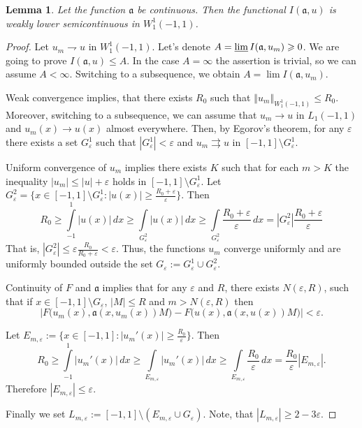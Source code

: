 \documentclass[12pt]{article}
\newcommand{\norm}[1]{\left\Vert#1\right\Vert}
\newcommand{\abs}[1]{\left\vert#1\right\vert}
\newcommand{\eps}{\varepsilon}
\renewcommand{\ge}{\geqslant}
\renewcommand{\le}{\leqslant}
\newtheorem{lm}{Lemma}
\newcommand{\W}{W_1^1}
\begin{document}
\begin{lm}
Let the function $\mathfrak a$ be continuous. Then the functional $I(\mathfrak a, u)$ is weakly lower semicontinuous in $\W(-1, 1)$.
\label{lowersemi}
\end{lm}

\begin{proof}
Let $u_m \rightharpoondown u$ in $\W(-1, 1)$.
Let's denote $A = \varliminf I( \mathfrak a, u_m ) \ge 0$.
We are going to prove $I(\mathfrak a, u) \le A$.
In the case $A = \infty$ the assertion is trivial, so we can assume $A < \infty$.
Switching to a subsequence, we obtain $A = \lim I( \mathfrak a, u_m )$.

Weak convergence implies, that there exists
$R_0$ such that $\norm{ u_m }_{\W(-1, 1)} \le R_0$.
Moreover, switching to a subsequence, we can assume that $u_m \to u$ in $L_1(-1, 1)$
and $u_m(x) \to u(x)$ almost everywhere.
Then, by Egorov's theorem, for any $\eps$ there exists a set
$G_\eps^1$ such that $\abs{ G_\eps^1 } < \eps$ and $u_m \rightrightarrows u$ in $[-1, 1] \setminus G_\eps^1$.

Uniform convergence of $u_m$ implies there exists $K$ such that for each $m>K$
the inequality $\abs{u_m} \le \abs{u} + \eps$ holds in $[-1, 1] \setminus G_\eps^1$.
Let $G_\eps^2 = \{x \in [-1, 1] \setminus G_\eps^1 : \abs{u(x)} \ge \frac{R_0 + \eps}{\eps} \}$.
Then
$$R_0 \ge \int\limits_{-1}^1 \abs{ u(x) } \, dx \ge \int\limits_{G_\eps^2} \abs{ u(x) } \, dx \ge
\int\limits_{G_\eps^2} \frac{R_0 + \eps}{\eps} \, dx = \abs{G_\eps^2} \frac{R_0 + \eps}{\eps}$$
That is, $\abs{G_\eps^2} \le \eps \frac{R_0}{R_0 + \eps} < \eps$.
Thus, the functions $u_m$ converge uniformly and are uniformly bounded outside the set $G_\eps := G_\eps^1 \cup G_\eps^2$.

Continuity of $F$ and $\mathfrak a$ implies that for any $\eps$ and $R$, there exists
$N( \eps, R )$, such that if $x \in [-1, 1] \setminus G_\eps$, $\abs{ M } \le R$ and $m > N( \eps, R )$ then
$$| F\big( u_m( x ), \mathfrak a( x, u_m( x ) ) M \big) - F\big( u( x ), \mathfrak a( x, u( x ) ) M \big) | < \eps.$$

Let $E_{m,\eps} := \{ x \in [-1, 1]: \abs{ u_m'( x ) } \ge \frac{ R_0 }{ \eps } \}$.
Then
$$R_0 \ge \int\limits_{-1}^1 \abs{ u_m'( x ) } \, dx \ge \int\limits_{ E_{m,\eps} } \abs{ u_m'( x ) } \, dx \ge
\int\limits_{ E_{m,\eps} } \frac{ R_0 }{ \eps } \, dx = \frac{ R_0 }{ \eps } \abs{ E_{m,\eps} }.$$
Therefore $\abs{ E_{m,\eps} } \le \eps$.

Finally we set $L_{m,\eps} := [-1, 1] \setminus ( E_{m,\eps} \cup G_\eps )$.
Note, that $\abs{ L_{m,\eps} } \ge 2 - 3 \eps$.


\end{proof}
\end{document}
